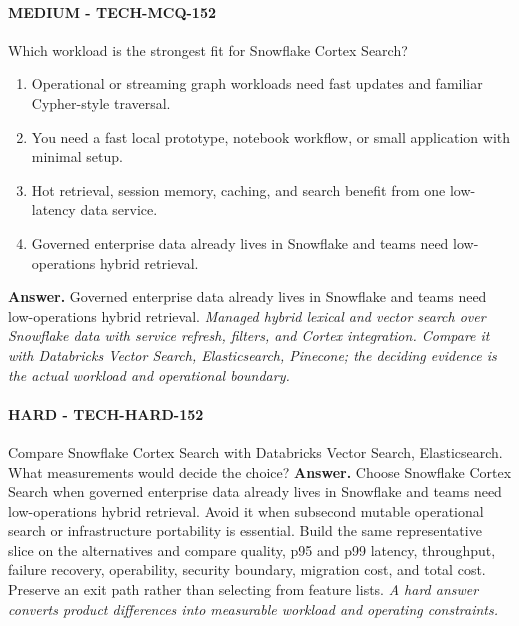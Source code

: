 \paragraph{MEDIUM - TECH-MCQ-152} Which workload is the strongest fit for Snowflake Cortex Search?
\begin{enumerate}[label=\Alph*.]
\item Operational or streaming graph workloads need fast updates and familiar Cypher-style traversal.
\item You need a fast local prototype, notebook workflow, or small application with minimal setup.
\item Hot retrieval, session memory, caching, and search benefit from one low-latency data service.
\item Governed enterprise data already lives in Snowflake and teams need low-operations hybrid retrieval.
\end{enumerate}
\textbf{Answer.} Governed enterprise data already lives in Snowflake and teams need low-operations hybrid retrieval.
\textit{Managed hybrid lexical and vector search over Snowflake data with service refresh, filters, and Cortex integration. Compare it with Databricks Vector Search, Elasticsearch, Pinecone; the deciding evidence is the actual workload and operational boundary.}
\paragraph{HARD - TECH-HARD-152} Compare Snowflake Cortex Search with Databricks Vector Search, Elasticsearch. What measurements would decide the choice?
\textbf{Answer.} Choose Snowflake Cortex Search when governed enterprise data already lives in Snowflake and teams need low-operations hybrid retrieval. Avoid it when subsecond mutable operational search or infrastructure portability is essential. Build the same representative slice on the alternatives and compare quality, p95 and p99 latency, throughput, failure recovery, operability, security boundary, migration cost, and total cost. Preserve an exit path rather than selecting from feature lists.
\textit{A hard answer converts product differences into measurable workload and operating constraints.}
